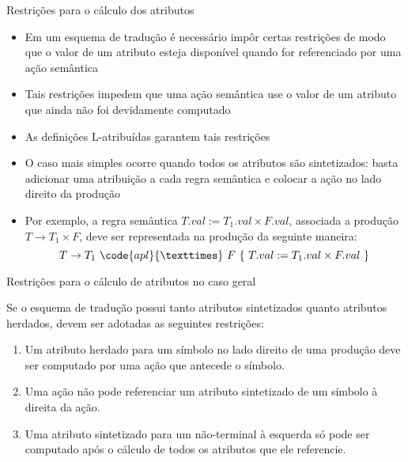\begin{frame}[fragile]{Restrições para o cálculo dos atributos}

    \begin{itemize}
        \item Em um esquema de tradução é necessário impôr certas restrições de modo que o valor de um atributo esteja disponível quando for referenciado por uma
            ação semântica
        \pause

        \item Tais restrições impedem que uma ação semântica use o valor de um atributo que ainda não foi devidamente computado
        \pause

        \item As definições L-atribuídas garantem tais restrições
        \pause

        \item O caso mais simples ocorre quando todos os atributos são sintetizados: basta adicionar uma atribuição a cada regra semântica e colocar a ação no 
            lado direito da produção
        \pause

        \item Por exemplo, a regra semântica $T.val := T_1.val\times F.val$, associada a produção $T\to T_1\times F$, deve ser representada na produção da
            seguinte maneira:
        \[
            T\to T_1\ \code{apl}{×}\ F\ \{\ T.val := T_1.val \times F.val\ \}
        \]
    \end{itemize}

\end{frame}

\begin{frame}[fragile]{Restrições para o cálculo de atributos no caso geral}

    Se o esquema de tradução possui tanto atributos sintetizados quanto atributos herdados, devem ser adotadas as seguintes restrições:
    \vspace{0.1in}
    \begin{enumerate}
        \item Um atributo herdado para um símbolo no lado direito de uma produção deve ser computado por uma ação que antecede o símbolo.
        \item Uma ação não pode referenciar um atributo sintetizado de um símbolo à direita da ação.
        \item Uma atributo sintetizado para um não-terminal à esquerda só pode ser computado após o cálculo de todos os atributos que ele referencie.
    \end{enumerate}

\end{frame}

